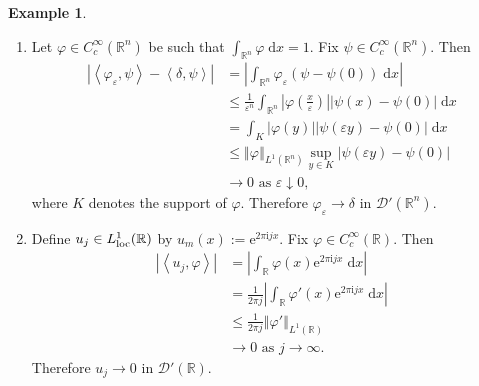 \documentclass{book}
\newcommand{\scrD}{\mathscr{D}}
\newcommand{\bbR}{\mathbb{R}}
\renewcommand{\d}{\mathrm{d}}
\newcommand{\e}{\mathrm{e}}
\renewcommand{\i}{\mathrm{i}}
\renewcommand{\epsilon}{\varepsilon}
\renewcommand{\phi}{\varphi}
\newcommand{\abs}[1]{\left\lvert {#1} \right\rvert}
\newcommand{\norm}[1]{\left\Vert {#1} \right\Vert}
\newcommand{\angles}[1]{\left\langle {#1} \right\rangle}
\newcommand{\parens}[1]{\left( {#1} \right)}
\theoremstyle{definition}
\newtheorem{example}[theorem]{Example}
\theoremstyle{remark}
\numberwithin{equation}{chapter}
\begin{document}
\begin{example}
    \begin{enumerate}[label=(\arabic*)]
        \item Let $\phi \in C_c^\infty(\bbR^n)$ be such that $\int_{\bbR^n} \phi \; \d x = 1$. Fix $\psi \in C_c^\infty(\bbR^n)$. Then
        \begin{equation} \begin{aligned}
            \abs{ \angles{ \phi_\epsilon,\psi } - \angles{ \delta,\psi } } &= \abs{ \int_{\bbR^n} \phi_\epsilon (\psi - \psi(0)) \; \d x }                                                      \\
                                                                          &\leq \frac{1}{\epsilon^n} \int_{\bbR^n} \abs{ \phi\parens{ \frac{x}{\epsilon} } } \abs{ \psi(x) - \psi(0) } \; \d x \\
                                                                          &= \int_{K} \abs{ \phi(y) } \abs{ \psi(\epsilon y) - \psi(0) } \; \d x                                               \\
                                                                          &\leq \norm{\phi}_{L^1(\bbR^n)} \sup_{y \in K} \abs{ \psi(\epsilon y) - \psi(0) }                                    \\
                                                                          &\rightarrow 0 \text{ as } \epsilon \downarrow 0,
        \end{aligned} \end{equation}
        where $K$ denotes the support of $\phi$. Therefore $\phi_\epsilon \rightarrow \delta$ in $\scrD'(\bbR^n)$.

        \item Define $u_j \in L_{\rm loc}^1(\bbR)$ by $u_m(x) := \e^{2\pi\i j x}$. Fix $\phi \in C_c^\infty(\bbR)$. Then 
        \begin{equation} \begin{aligned}
            \abs{\angles{ u_j,\phi}} &= \abs{ \int_{\bbR} \phi(x) \e^{2\pi\i j x} \; \d x }                \\
                                     &= \frac{1}{2\pi j} \abs{ \int_\bbR \phi'(x) \e^{2\pi\i jx} \; \d x } \\
                                     &\leq \frac{1}{2\pi j} \norm{\phi'}_{L^1(\bbR)}                       \\
                                     &\rightarrow 0 \text{ as } j \rightarrow \infty.
        \end{aligned} \end{equation}
        Therefore $u_j \rightarrow 0$ in $\scrD'(\bbR)$.
    \end{enumerate}
\end{example}
\end{document}
